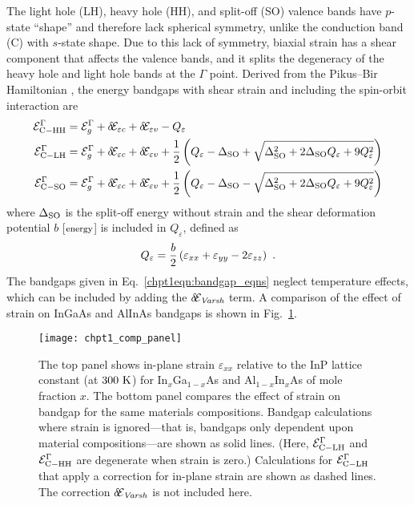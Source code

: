 {The light hole (LH), heavy hole (HH), and split-off (SO) valence bands have \mbox{$p$-state} ``shape'' and therefore lack spherical symmetry, unlike the conduction band (C) with \mbox{$s$-state} shape.  Due to this lack of symmetry, biaxial strain has a shear component that affects the valence bands, and it splits the degeneracy of the heavy hole and light hole bands at the $\Gamma$ point.  Derived from the Pikus--Bir Hamiltonian \cite{Pikus-Bir}, the energy bandgaps with shear strain and including the spin-orbit interaction are
\begin{subequations}
\begin{align}
\label{chpt1eqn:bandgap_eqns}
\EE_{\tn{C}-\tn{HH}}^\Gamma &= \EE_g^\Gamma+\delta\!\EE_{\varepsilon c}+\delta\!\EE_{\varepsilon v}-Q_\varepsilon\\
\EE_{\tn{C}-\tn{LH}}^\Gamma &= \EE_g^\Gamma+\delta\!\EE_{\varepsilon c}+\delta\!\EE_{\varepsilon v} + \frac{1}{2} \left(Q_\varepsilon-\Delta_{\tn{SO}}+\sqrt{\Delta_{\tn{SO}}^2+2 \Delta_{\tn{SO}} Q_\varepsilon +9 Q_\varepsilon^2}\right)\\
\EE_{\tn{C}-\tn{SO}}^\Gamma &= \EE_g^\Gamma+\delta\!\EE_{\varepsilon c}+\delta\!\EE_{\varepsilon v} + \frac{1}{2} \left(Q_\varepsilon-\Delta_{\tn{SO}}-\sqrt{\Delta_{\tn{SO}}^2+2 \Delta_{\tn{SO}} Q_\varepsilon +9 Q_\varepsilon^2}\right)
\end{align}
\end{subequations}
where $\Delta_{\textnormal{SO}}$ is the split-off energy without strain and the shear deformation potential $b$ [$\textnormal{\footnotesize{energy}}$] is included in $Q_\varepsilon$, defined as
\begin{equation}
Q_\varepsilon = \frac{b}{2} \left( \varepsilon_{xx}+\varepsilon_{yy}-2\varepsilon_{zz} \right) \textnormal{~.}
\end{equation}
The bandgaps given in Eq.~\eqref{chpt1eqn:bandgap_eqns} neglect temperature effects, which can be included by adding the $\delta\!\EE_\textit{Varsh}$ term.  A comparison of the effect of strain on InGaAs and AlInAs bandgaps is shown in Fig.~\ref{chpt1:strain_effect}.

\begin{figure}[tp]
\centering
\texttt{[image: chpt1\_comp\_panel]}
\caption[Bandgap strain dependence]{  The top panel shows in-plane strain $\varepsilon_{xx}$ relative to the InP lattice constant (at $300~\textnormal{K}$) for In$_x$Ga$_{1-x}$As and Al$_{1-x}$In$_{x}$As of mole fraction $x$.  The bottom panel compares the effect of strain on bandgap for the same materials compositions.  Bandgap calculations where strain is ignored---that is, bandgaps only dependent upon material compositions---are shown as solid lines.  (Here, $\EE_{\tn{C}-\tn{LH}}^\Gamma$ and $\EE_{\tn{C}-\tn{HH}}^\Gamma$ are degenerate when strain is zero.)  Calculations for $\EE_{\tn{C}-\tn{LH}}^\Gamma$ that apply a correction for in-plane strain are shown as dashed lines.  The correction $\delta\!\EE_\tn{\textit{Varsh}}$ is not included here.}
\label{chpt1:strain_effect}
\end{figure}


}
